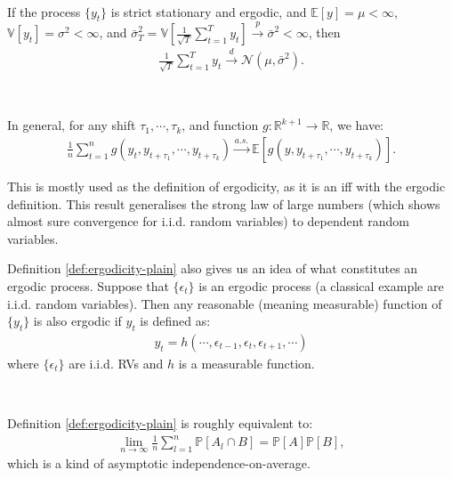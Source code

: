 \begin{proposition}\label{prop:clt-ss-ergodic}
    \
    
    If the process $\{y_t\}$ is strict stationary and ergodic, and $\mathbb{E}[y] = \mu < \infty$,
    $\mathbb{V}[y_t] = \sigma^2 < \infty$, and $\bar{\sigma}_T^2 = \mathbb{V}[\frac{1}{\sqrt{T}}\sum_{t=1}^{T} y_t] \xrightarrow{p} \bar{\sigma}^2 < \infty$,
    then
    \begin{gather*}
        \frac{1}{\sqrt{T}} \sum_{t=1}^{T} y_t \xrightarrow{d} \mathcal{N}(\mu, \bar{\sigma}^2).
    \end{gather*}
\end{proposition}

\begin{definition}\label{def:ergodicity-plain}
    \

    In general, for any shift $\tau_1, \cdots, \tau_k$, and function $g: \mathbb{R}^{k+1} \to \mathbb{R}$,
    we have:
    \begin{gather*}
        \frac{1}{n} \sum_{t=1}^{n} g(y_t, y_{t+\tau_1}, \cdots, y_{t+\tau_k}) \xrightarrow{a.s.} \mathbb{E}[g(y, y_{t+\tau_1}, \cdots, y_{t+\tau_k})].
    \end{gather*}
\end{definition}
This is mostly used as the definition of ergodicity,
as it is an iff with the ergodic definition.
This result generalises the strong law of large numbers
(which shows almost sure convergence for i.i.d. random variables)
to dependent random variables.

Definition \ref{def:ergodicity-plain} also gives us an idea of what constitutes an ergodic process.
Suppose that $\{\epsilon_t\}$ is an ergodic process (a classical example are i.i.d. random variables).
Then any reasonable (meaning measurable) function of $\{y_t\}$ is also ergodic
if $y_t$ is defined as:
\begin{gather*}
    y_t = h(\cdots, \epsilon_{t-1}, \epsilon_t, \epsilon_{t+1}, \cdots)
\end{gather*}
where $\{\epsilon_t\}$ are i.i.d. RVs and $h$ is a measurable function.

\begin{remark}
    \

    Definition \ref{def:ergodicity-plain} is roughly equivalent to:
    \begin{gather*}
        \lim_{n \to \infty} \frac{1}{n} \sum_{l=1}^{n} \mathbb{P}[A_l \cap B] = \mathbb{P}[A] \mathbb{P}[B],
    \end{gather*}
    which is a kind of asymptotic independence-on-average.
\end{remark}


